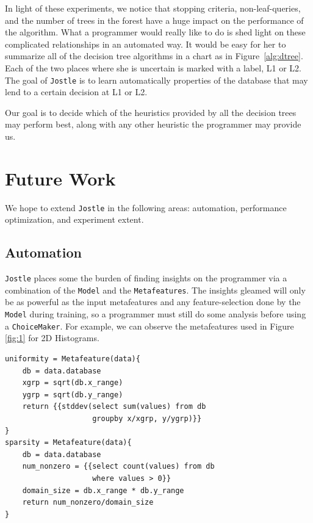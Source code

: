 \documentclass[11pt]{report}
\newcommand{\Jostle}{\texttt{Jostle}}
\renewcommand{\t}[1]{\texttt{#1}}
\begin{document}
In light of these experiments, we notice that stopping criteria, non-leaf-queries, and the number of trees in the forest have a huge impact on the performance of the algorithm. What a programmer would really like to do is shed light on these complicated relationships in an automated way. It would be easy for her to summarize all of the decision tree algorithms in a chart as in Figure~\ref{alg:dtree}. Each of the two places where she is uncertain is marked with a label, L1 or L2. The goal of \Jostle{} is to learn automatically properties of the database that may lend to a certain decision at L1 or L2.

Our goal is to decide which of the heuristics provided by all the decision trees may perform best, along with any other heuristic the programmer may provide us. 

\chapter{Future Work}\label{ch:future}
We hope to extend \Jostle{} in the following areas: automation, performance optimization, and experiment extent.
\section{Automation}
\Jostle{} places some the burden of finding insights on the programmer via a combination of the \t{Model} and the \t{Metafeatures}. The insights gleamed will only be as powerful as the input metafeatures and any feature-selection done by the \t{Model} during training, so a programmer must still do some analysis before using a \t{ChoiceMaker}. For example, we can observe the metafeatures used in Figure \ref{fig:1} for 2D Histograms.
\begin{lstlisting}[style=MyPythonStyle]
uniformity = Metafeature(data){
    db = data.database
    xgrp = sqrt(db.x_range)
    ygrp = sqrt(db.y_range)
    return {{stddev(select sum(values) from db 
                    groupby x/xgrp, y/ygrp)}}
}
sparsity = Metafeature(data){
    db = data.database
    num_nonzero = {{select count(values) from db 
                    where values > 0}}
    domain_size = db.x_range * db.y_range
    return num_nonzero/domain_size
}
\end{lstlisting}
\end{document}
